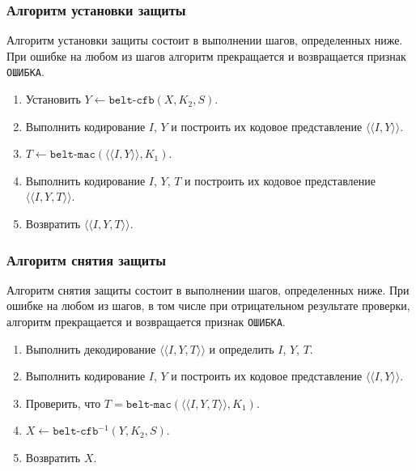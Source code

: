 \subsubsection{Алгоритм установки защиты}
\label{CRYPTO.SM.Algs.Encr}

Алгоритм установки защиты состоит в выполнении шагов, определенных ниже.
При ошибке на любом из шагов алгоритм прекращается и возвращается признак 
\texttt{ОШИБКА}.

\begin{enumerate}
\item
Установить $Y\gets\texttt{belt-cfb}(X, K_2, S)$.

\item
Выполнить кодирование $I$, $Y$ и построить их кодовое 
представление $\langle\langle I, Y\rangle\rangle$.

\item
$T\gets\texttt{belt-mac}(\langle\langle I, Y \rangle\rangle, K_1)$.

\item
Выполнить кодирование $I$, $Y$, $T$ и построить их кодовое 
представление $\langle\langle I, Y, T \rangle\rangle$.

\item
Возвратить $\langle\langle I, Y, T \rangle\rangle$.
\end{enumerate}

\subsubsection{Алгоритм снятия защиты}
\label{CRYPTO.SM.Algs.Decr}

Алгоритм снятия защиты состоит в выполнении шагов, определенных ниже. При 
ошибке на любом из шагов, в том числе при отрицательном результате 
проверки, алгоритм прекращается и возвращается признак \texttt{ОШИБКА}.

\begin{enumerate}
\item
Выполнить декодирование $\langle\langle I, Y, T \rangle\rangle$ 
и определить $I$, $Y$, $T$.
 
\item
Выполнить кодирование $I$, $Y$ и построить их кодовое представление 
$\langle\langle I, Y \rangle\rangle$.
 
\item
Проверить, 
что $T=\texttt{belt-mac}(\langle\langle I, Y, T\rangle\rangle, K_1)$.
 
\item
$X\leftarrow\texttt{belt-cfb}^{-1}(Y, K_2, S)$.
 
\item
Возвратить $X$.
\end{enumerate}

